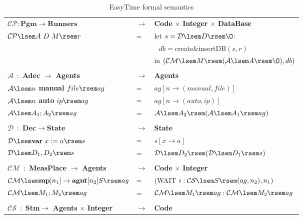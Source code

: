 \documentclass[preprint, prX]{revtex4}
\begin{document}
\begin{table}[!htb]
\caption{EasyTime formal semantics}
\label{tab:tab6}
\footnotesize
\vspace{-5mm}
\begin{center}
\begin{tabular}{ | l  l  l | }
\hline
  $\mathcal{CP}:\textbf{Pgm} \rightarrow \textbf{Runners}$ & $\rightarrow$ & \textbf{Code} $\times$ \textbf{Integer} $\times$ \textbf{DataBase} \\
  $\mathcal{CP} \lsem A\ D\ M \rsem r$ & = & let $s= \mathcal{D} \lsem D \rsem \O$: \\
  & & $\>\>\>db = $\textnormal{create\&insertDB}$(s,r)$ \\
  & & in $(\mathcal{CM}\lsem M \rsem (\mathcal{A}\lsem A \rsem \O), db)$ \\
  & & \\
  $\mathcal{A}$~:~\textbf{Adec} $\rightarrow$ \textbf{Agents} & $\rightarrow$ & \textbf{Agents} \\
  $\mathcal{A} \lsem n$ \textbf{manual} $ file\rsem ag$ & = & $ag [ n \rightarrow (manual, file) ]$ \\
  $\mathcal{A} \lsem n$ \textbf{auto} $ ip\rsem ag$ & = & $ag [ n \rightarrow (auto, ip) ]$ \\
  $\mathcal{A} \lsem A_{1};A_{2}\rsem ag$ & = & $\mathcal{A} \lsem A_{2} \rsem (\mathcal{A} \lsem A_{1} \rsem ag)$ \\
  & & \\
  $\mathcal{D}$~:~\textbf{Dec}$\rightarrow$\textbf{State} & $\rightarrow$ & \textbf{State} \\
  $\mathcal{D} \lsem \textbf{var}\ x := a \rsem s$ & = & $s[x \rightarrow a]$ \\
  $\mathcal{D} \lsem D_{1},D_{2} \rsem s$ & = & $\mathcal{D} \lsem D_{2} \rsem (\mathcal{D} \lsem D_{1} \rsem s)$\\
  & & \\
  $\mathcal{CM}$~:~\textbf{MeasPlace} $\rightarrow$ \textbf{Agents}&$\rightarrow$&\textbf{Code} $\times$ \textbf{Integer} \\
  $\mathcal{CM} \lsem \textbf{mp}[n_{1}] \rightarrow \textbf{agnt}[n_{2}] S \rsem ag$&=&(WAIT $i:\mathcal{CS} \lsem S \rsem (ag, n_{2}),
  n_{1} )$  \\
  $\mathcal{CM} \lsem M_{1}; M_{2} \rsem ag$&=&$\mathcal{CM} \lsem M_{1} \rsem ag: \mathcal{CM} \lsem M_{2} \rsem ag$ \\
  & & \\
  $\mathcal{CS}$~:~\textbf{Stm}$\rightarrow$ \textbf{Agents} $\times$ \textbf{Integer} & $\rightarrow$ & \textbf{Code} \\

\end{tabular}
\end{center}
\end{table}
\end{document}
